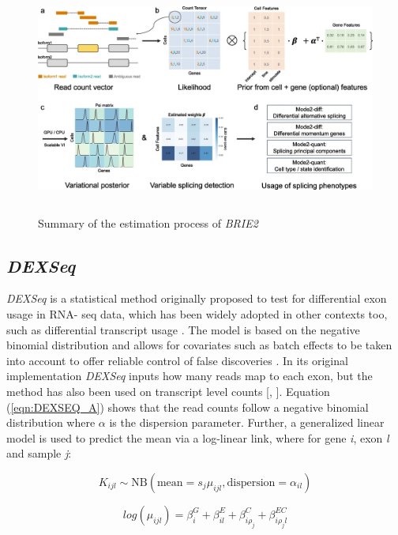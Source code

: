 \begin{figure}[!htb]
\begin{center}
\includegraphics[width=6in,height=3in]{../figures/brie2_process.jpg}
\end{center}
\caption{Summary of the estimation process of \emph{BRIE2} \citep{brie2}}
\label{fig:brie2_process}
\end{figure}
\FloatBarrier

\subsection{\emph{DEXSeq}}
\emph{DEXSeq} \citep{dexseq} is a statistical method originally proposed to test for differential exon usage in RNA- seq data, which has been widely adopted in other contexts too, such as differential transcript usage \citep{swimming_downstream}. The model is based on the negative binomial distribution and allows for covariates such as batch effects to be taken into account to offer reliable control of false discoveries \citep{dexseq}. In its original implementation \emph{DEXSeq} inputs how many reads map to each exon, but the method has also been used on transcript level counts [\citep{swimming_downstream}, \citep{bandits}]. Equation (\ref{eqn:DEXSEQ_A}) shows that the read counts follow a negative binomial distribution where $\alpha$ is the dispersion parameter. Further, a generalized linear model is used to predict the mean via a log-linear link, where for gene \emph{i}, exon \emph{l} and sample \emph{j}:

\begin{equation}
K_{ijl} \sim \text{NB}(\text{mean}=s_j \mu_{ijl}, \text{dispersion}=\alpha_{il})
\label{eqn:DEXSEQ_A}
\end{equation}

\begin{equation}
log(\mu_{ijl}) = \beta^G_i + \beta^E_{il} + \beta_{i \rho_j}^C + \beta^{EC}_{i \rho_j l}
\label{eqn:DEXSEQ_B}
\end{equation}

